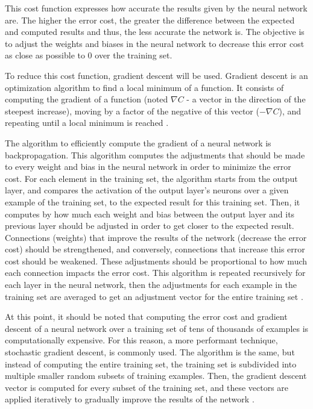\documentclass[12pt,a4paper,titlepage]{article}
\begin{document}
This cost function expresses how accurate the results given by the neural network are. The higher the error cost, the greater the difference between the expected and computed results and thus, the less accurate the network is. The objective is to adjust the weights and biases in the neural network to decrease this error cost as close as possible to 0 over the training set.

To reduce this cost function, gradient descent will be used. Gradient descent is an optimization algorithm to find a local minimum of a function. It consists of computing the gradient of a function (noted \(\nabla C\) - a vector in the direction of the steepest increase), moving by a factor of the negative of this vector (\(-\nabla C\)), and repeating until a local minimum is reached \cite{sanderson_gradient_2017}.

The algorithm to efficiently compute the gradient of a neural network is backpropagation. This algorithm computes the adjustments that should be made to every weight and bias in the neural network in order to minimize the error cost. For each element in the training set, the algorithm starts from the output layer, and compares the activation of the output layer's neurons over a given example of the training set, to the expected result for this training set. Then, it computes by how much each weight and bias between the output layer and its previous layer should be adjusted in order to get closer to the expected result. Connections (weights) that improve the results of the network (decrease the error cost) should be strengthened, and conversely, connections that increase this error cost should be weakened. These adjustments should be proportional to how much each connection impacts the error cost. This algorithm is repeated recursively for each layer in the neural network, then the adjustments for each example in the training set are averaged to get an adjustment vector for the entire training set \cite{sanderson_gradient_2017}.

At this point, it should be noted that computing the error cost and gradient descent of a neural network over a training set of tens of thousands of examples is computationally expensive. For this reason, a more performant technique, stochastic gradient descent, is commonly used. The algorithm is the same, but instead of computing the entire training set, the training set is subdivided into multiple smaller random subsets of training examples. Then, the gradient descent vector is computed for every subset of the training set, and these vectors are applied iteratively to gradually improve the results of the network \cite{sanderson_gradient_2017}.
\end{document}
